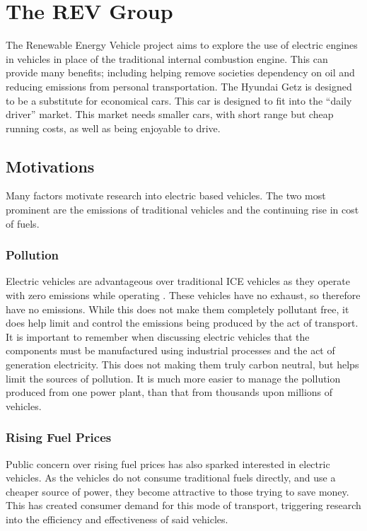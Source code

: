 \section{The REV Group}

The Renewable Energy Vehicle project aims to explore the use of electric engines in vehicles in place of the traditional internal combustion engine. This can provide many benefits; including helping remove societies dependency on oil and reducing emissions from personal transportation. The Hyundai Getz is designed to be a substitute for economical cars. This car is designed to fit into the “daily driver” market. This market needs smaller cars, with short range but cheap running costs, as well as being enjoyable to drive. 

\subsection{Motivations} 
 
Many factors motivate research into electric based vehicles. The two most prominent are the emissions of traditional vehicles and the continuing rise in cost of fuels.

\subsubsection{Pollution} %

Electric vehicles are advantageous over traditional ICE vehicles as they operate with zero emissions while operating . These vehicles have no exhaust, so therefore have no emissions. While this does not make them completely pollutant free, it does help limit and control the emissions being produced by the act of transport. It is important to remember when discussing electric vehicles that the components must be manufactured using industrial processes and the act of generation electricity. This does not making them truly carbon neutral, but helps limit the sources of pollution. It is much more easier to manage the pollution produced from one power plant, than that from thousands upon millions of vehicles.


\subsubsection{Rising Fuel Prices}

Public concern over rising fuel prices has also sparked interested in electric vehicles. As the vehicles do not consume traditional fuels directly, and use a cheaper source of power, they become attractive to those trying to save money. This has created consumer demand for this mode of transport, triggering research into the efficiency and effectiveness of said vehicles.
